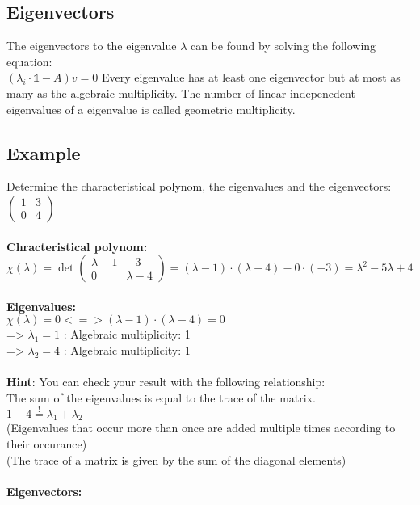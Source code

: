 \documentclass[10pt,a4paper]{article}
\begin{document}
\subsection{Eigenvectors}
The eigenvectors to the eigenvalue $\lambda$ can be found by solving the following equation:\\ 
$(\lambda_i  \cdot \mathbb{1} - A) v = 0$
Every eigenvalue has at least one eigenvector but at most as many as the algebraic multiplicity. The number of linear indepenedent eigenvalues of a eigenvalue is called geometric multiplicity.
\subsection{Example}
Determine the characteristical polynom, the eigenvalues and the eigenvectors:\\
$\left(\begin{array}{cc}
 1 & 3\\
 0 & 4
\end{array}  \right)$\\
\ \\
\textbf{Chracteristical polynom:}\\
$\chi(\lambda)= \det\left(\begin{array}{cc}
\lambda -1 & -3 \\
0 & \lambda - 4
\end{array} \right)
= (\lambda-1) \cdot (\lambda -4) -0 \cdot (-3)=\lambda^2-5 \lambda +4$\\
\ \\
\textbf{Eigenvalues:}\\
$\chi(\lambda) = 0 <=> (\lambda-1) \cdot (\lambda-4) =0$\\
=> $\lambda_1 = 1$ : Algebraic multiplicity: 1\\
=> $\lambda_2 = 4$ : Algebraic multiplicity: 1\\
\ \\
\textbf{Hint}: You can check your result with the following relationship:\\ 
The sum of the eigenvalues is equal to the trace of the matrix.\\
$1+4 \stackrel{!}{=} \lambda_1 + \lambda_2$\\
(Eigenvalues that occur more than once are added multiple times according to their occurance)\\
(The trace of a matrix is given by the sum of the diagonal elements)\\
\ \\
\textbf{Eigenvectors:}\\
\end{document}
